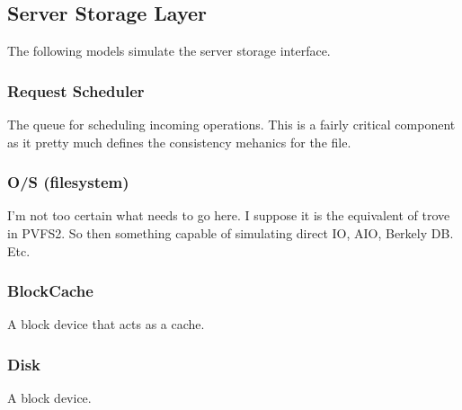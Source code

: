 \documentclass[11pt]{article}
\begin{document}
\subsection{Server Storage Layer}
The following models simulate the server storage interface.

\subsubsection{Request Scheduler}
The queue for scheduling incoming operations.  This is a fairly critical
component as it pretty much defines the consistency mehanics for the file.

\subsubsection{O/S (filesystem)}
I'm not too certain what needs to go here.  I suppose it is the equivalent of
trove in PVFS2.  So then something capable of simulating direct IO, AIO,
Berkely DB.  Etc.

\subsubsection{BlockCache}
A block device that acts as a cache.

\subsubsection{Disk}
A block device.
\end{document}

